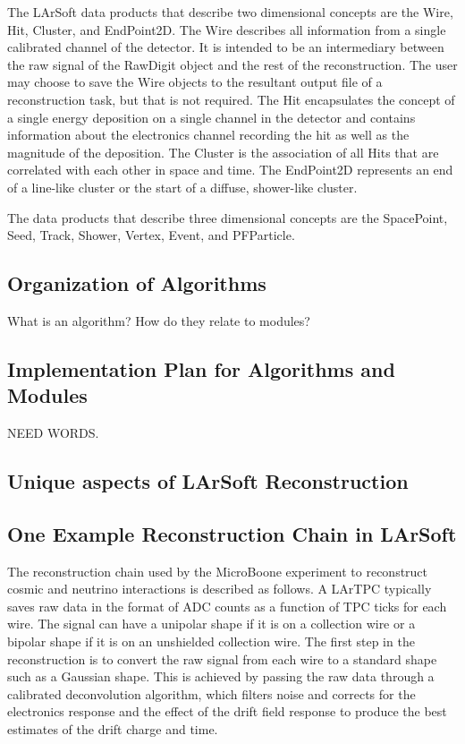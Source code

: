 \documentclass[12pt]{elsarticle}
\newcommand{\larsoft}{LArSoft }
\begin{document}
The \larsoft data products that describe two dimensional concepts are the Wire, Hit, Cluster, and EndPoint2D.  The Wire describes all information from a single calibrated channel of the detector.  It is intended to be an intermediary between the raw signal of the RawDigit object and the rest of the reconstruction.  The user may choose to save the Wire objects to the resultant output file of a reconstruction task, but that is not required.  The Hit encapsulates the concept of a single energy deposition on a single channel in the detector and contains information about the electronics channel recording the hit as well as the magnitude of the deposition.  The Cluster is the association of all Hits that are correlated with each other in space and time.  The EndPoint2D represents an end of a line-like cluster or the start of a diffuse, shower-like cluster.

The data products that describe three dimensional concepts are the SpacePoint, Seed, Track, Shower, Vertex, Event, and PFParticle.  

\subsection{Organization of Algorithms}

What is an algorithm? How do they relate to modules?

\subsection{Implementation Plan for Algorithms and Modules}
NEED WORDS.

\subsection{Unique aspects of \larsoft Reconstruction}

\subsection{One Example Reconstruction Chain in \larsoft}
The reconstruction chain used by the MicroBoone experiment to reconstruct cosmic and neutrino interactions is described as follows. A LArTPC typically saves raw data in the format of ADC counts as a function of TPC ticks for each wire. The signal can have a unipolar shape if it is on a collection wire or a bipolar shape if it is on an unshielded collection wire. The first step in the reconstruction is to convert the raw signal from each wire to a standard shape such as a Gaussian shape. This is achieved by passing the raw data through a calibrated deconvolution algorithm, which filters noise and corrects for the electronics response and the effect of the drift field response to produce the best estimates of the drift charge and time. 
\end{document}
